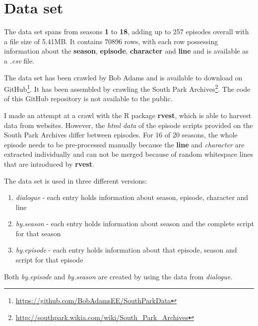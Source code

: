 \documentclass[10pt,a4paper]{article}
\begin{document}
	\section{Data set}	
	The data set spans from seasons \textbf{1} to \textbf{18}, adding up to 257 episodes overall with a file size of 5.41MB. It contains 70896 rows, with each row possessing information about the \textbf{season}, \textbf{episode}, \textbf{character} and \textbf{line} and is available as a \textit{.csv} file.
	
	The data set has been crawled by Bob Adams and is available to download on GitHub\footnote{\url{https://github.com/BobAdamsEE/SouthParkData}}. It has been assembled by crawling the South Park Archives\footnote{\url{http://southpark.wikia.com/wiki/South_Park_Archives}}. The code of this GitHub repository is not available to the public.
	
	 I made an attempt at a crawl with the R package \textbf{rvest}, which is able to harvest data from websites.  However, the \textit{html data} of the episode scripts provided on the South Park Archives differ between episodes. For 16 of 20 seasons, the whole episode needs to be pre-processed manually because the \textbf{line} and \textit{character} are extracted individually and can not be merged because of random whitespace lines that are introduced by \textbf{rvest}.
	 
	 The data set is used in three different versions:
	 \begin{enumerate}
	 \item \textit{dialogue} - each entry holds information about season, episode, character and line
	 \item \textit{by.season} - each entry holds information about season and the complete script for that season
	 \item \textit{by.episode} - each entry holds information about that episode, season and script for that episode
	 \end{enumerate}
	 
	 Both \textit{by.episode} and \textit{by.season} are created by using the data from \textit{dialogue}.
	
\end{document}

